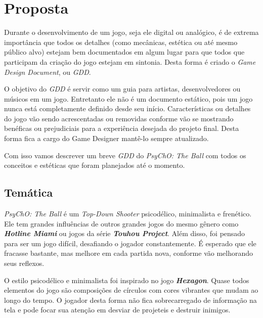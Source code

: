 
\chapter{Proposta}
\label{cap:proposta}

Durante o desenvolvimento de um jogo, seja ele digital ou analógico, é de extrema importância
que todos os detalhes (como mecânicas, estética ou até mesmo público alvo) estejam bem documentados
em algum lugar para que todos que participam da criação do jogo estejam em sintonia. Desta forma
é criado o \textit{Game Design Document}, ou \textit{GDD}.

O objetivo do \textit{GDD} é servir como um guia para artistas, desenvolvedores ou músicos em um
jogo. Entretanto ele não é um documento estático, pois um jogo nunca está completamente definido desde seu
início. Características ou detalhes do jogo vão sendo acrescentadas ou removidas conforme vão se mostrando
benéficas ou prejudiciais para a experiência desejada do projeto final. Desta forma fica a cargo do Game
Designer mantê-lo sempre atualizado.

Com isso vamos descrever um breve \textit{GDD} do \textit{PsyChO: The Ball} com todos os conceitos e
estéticas que foram planejados até o momento.

\section{Temática}
\label{sec:tematica}

\textit{PsyChO: The Ball} é um \textit{Top-Down Shooter} psicodélico, minimalista e frenético. Ele tem grandes influências de
outros grandes jogos do mesmo gênero como \textbf{\textit{Hotline Miami}}\cite{hotline} ou
jogos da série \textbf{\textit{Touhou Project}}\cite{touhou}. Além disso, foi pensado para ser um jogo
difícil, desafiando o jogador constantemente. É esperado que ele fracasse bastante, mas melhore em cada partida nova, conforme vão melhorando
seus reflexos.

O estilo psicodélico e minimalista foi inspirado no jogo \textbf{\textit{Hexagon}}\cite{hexagon}. Quase
todos elementos do jogo são composições de círculos com cores vibrantes que mudam ao longo do tempo. O jogador desta forma não fica sobrecarregado de
informação na tela e pode focar sua atenção em desviar de projeteis e destruir inimigos.

